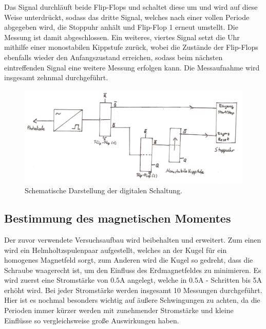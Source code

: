     Das Signal durchläuft beide Flip-Flops und schaltet diese um und wird auf diese Weise unterdrückt, sodass das dritte Signal,
    welches nach einer vollen Periode abgegeben wird, die Stoppuhr anhält und Flip-Flop 1 erneut umstellt. Die Messung ist damit abgeschlossen.
    Ein weiteres, viertes Signal setzt die Uhr mithilfe einer
    monostabilen Kippstufe zurück, wobei die Zustände der Flip-Flops ebenfalls wieder den Anfangszustand erreichen,
    sodass beim nächsten eintreffenden Signal eine weitere Messung erfolgen kann.
    Die Messaufnahme wird insgesamt zehnmal durchgeführt.
    \begin{figure}
        \centering
        \includegraphics[width=\textwidth]{content/schaltung.png}
        \caption{Schematische Darstellung der digitalen Schaltung.}
        \label{fig:schaltung}
    \end{figure}
\subsection{Bestimmung des magnetischen Momentes} 
    Der zuvor verwendete Versuchsaufbau wird beibehalten und erweitert. Zum einen wird ein Helmholtzspulenpaar aufgestellt, welches
    an der Kugel für ein homogenes Magnetfeld sorgt, zum Anderen wird die Kugel so gedreht, dass die Schraube waagerecht ist, um
    den Einfluss des Erdmagnetfeldes zu minimieren. 
    Es wird zuerst eine Stromstärke von $0.5$A angelegt, welche in $0.5$A - Schritten bis 5A erhöht wird. Bei jeder Stromstärke
    werden insgesamt 10 Messungen durchgeführt. Hier ist es nochmal besonders wichtig auf äußere Schwingungen zu achten, da die
    Perioden immer kürzer werden mit zunehmender Stromstärke und kleine Einflüsse so vergleichsweise große Auswirkungen haben.
